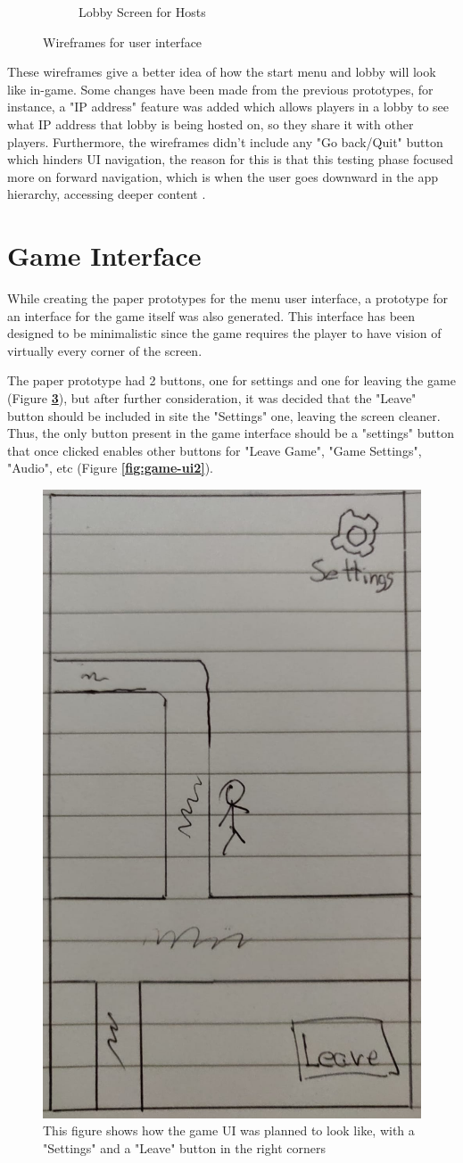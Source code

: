 \documentclass{dissertation}
\begin{document}
\begin{figure}[H]
\begin{subfigure}[h]{.5\textwidth}
\caption{Lobby Screen for Hosts}
\label{fig:pp3}
\end{subfigure}
\caption{Wireframes for user interface}
\label{fig:wireframe}
\end{figure}

These wireframes give a better idea of how the start menu and lobby will look like in-game. Some changes have been made from the previous prototypes, for instance, a "IP address" feature was added which allows players in a lobby to see what IP address that lobby is being hosted on, so they share it with other players. Furthermore, the wireframes didn't include any "Go back/Quit" button which hinders UI navigation, the reason for this is that this testing phase focused more on forward navigation, which is when the user goes downward in the app hierarchy, accessing deeper content \citep{mat21}.

\section{Game Interface}

While creating the paper prototypes for the menu user interface, a prototype for an interface for the game itself was also generated. This interface has been designed to be minimalistic since the game requires the player to have vision of virtually every corner of the screen. 

The paper prototype had 2 buttons, one for settings and one for leaving the game (Figure \textbf{\ref{fig:game-ui}}), but after further consideration, it was decided that the "Leave" button should be included in site the "Settings" one, leaving the screen cleaner. Thus, the only button present in the game interface should be a "settings" button that once clicked enables other buttons for "Leave Game", "Game Settings", "Audio", etc (Figure \textbf{\ref{fig:game-ui2}}).

\begin{figure}[H]
\centering
\includegraphics[width = .4\linewidth]{images/paper-prototype5.jpeg}
\caption{This figure shows how the game UI was planned to look like, with a "Settings" and a "Leave" button in the right corners}
\label{fig:game-ui}
\end{figure}
\end{document}
